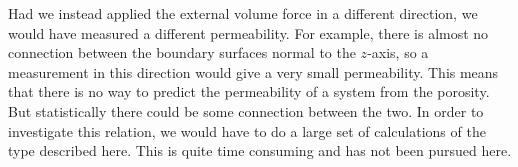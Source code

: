 \documentclass[12pt]{article}
\begin{document}
Had we instead applied the external volume force in a different direction, we would have measured a different permeability. For example, there is almost no connection between the boundary surfaces normal to the
$z$-axis, so a measurement in this direction would give a very small permeability. This means that there is no way to predict the permeability of a system from the porosity. But statistically there could
be some connection between the two. In order to investigate this relation, we would have to do a large set of calculations of the type described here. This is quite time consuming and has not been pursued here.

\end{document}

